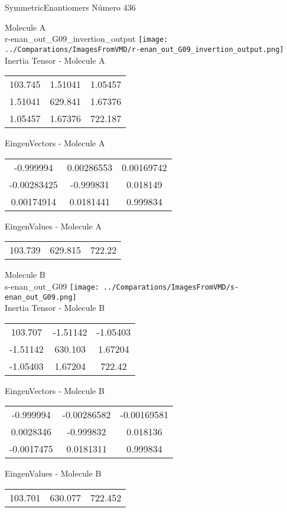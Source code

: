 \vtab[-2cm]
\begin{center}
{\large SymmetricEnantiomers \tab Número 436}
\end{center}
\begin{multicols}{2}
\begin{center}

Molecule A \\ 
r-enan\_out\_G09\_invertion\_output
\texttt{[image: ../Comparations/ImagesFromVMD/r-enan\_out\_G09\_invertion\_output.png]}
\\
Inertia Tensor - Molecule A \\
\vtab

\begin{tabular}{|c c c|}
103.745	 & 	1.51041	 & 	1.05457	 \\
1.51041	 & 	629.841	 & 	1.67376	 \\
1.05457	 & 	1.67376	 & 	722.187
\end{tabular}

\vtab
 EingenVectors - Molecule A     \\
\vtab
\begin{tabular}{|c c c|}
-0.999994	 & 	0.00286553	 & 	0.00169742	 \\
-0.00283425	 & 	-0.999831	 & 	0.018149	 \\
0.00174914	 & 	0.0181441	 & 	0.999834
\end{tabular}

\vtab
 EingenValues - Molecule A     \\
\vtab
\begin{tabular}{|c c c|}
103.739	 & 	629.815	 & 	722.22	 \\
\end{tabular}
\columnbreak

Molecule B \\ 
s-enan\_out\_G09
\texttt{[image: ../Comparations/ImagesFromVMD/s-enan\_out\_G09.png]}
\\
Inertia Tensor - Molecule B \\
\vtab

\begin{tabular}{|c c c|}
103.707	 & 	-1.51142	 & 	-1.05403	 \\
-1.51142	 & 	630.103	 & 	1.67204	 \\
-1.05403	 & 	1.67204	 & 	722.42
\end{tabular}

\vtab
 EingenVectors - Molecule B     \\
\vtab
\begin{tabular}{|c c c|}
-0.999994	 & 	-0.00286582	 & 	-0.00169581	 \\
0.0028346	 & 	-0.999832	 & 	0.018136	 \\
-0.0017475	 & 	0.0181311	 & 	0.999834
\end{tabular}

\vtab
 EingenValues - Molecule B     \\
\vtab
\begin{tabular}{|c c c|}
103.701	 & 	630.077	 & 	722.452	 \\
\end{tabular}

\end{center}
\end{multicols}
